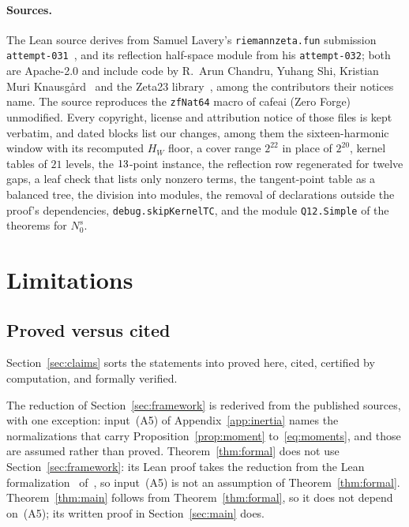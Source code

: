 \documentclass[11pt]{article}
\theoremstyle{definition}
\begin{document}
\begin{sloppypar}
\paragraph{Sources.}
The Lean source derives from Samuel Lavery's \texttt{riemannzeta.fun}
submission \texttt{attempt-031}~\cite{Lav26}, and its reflection half-space
module from his \texttt{attempt-032}; both are Apache-2.0 and include code by
R.~Arun Chandru, Yuhang Shi, Kristian Muri Knausg\aa rd~\cite{Kna26} and the
Zeta23 library~\cite{Zeta23Lean}, among the contributors their notices name.
The source reproduces the \texttt{zfNat64} macro of cafeai (Zero Forge)
unmodified. Every copyright, license and attribution notice of those files is
kept verbatim, and dated blocks list our changes, among them the sixteen-harmonic
window with its recomputed $H_W$ floor, a cover range $2^{22}$ in place of
$2^{20}$, kernel tables of $21$ levels, the $13$-point instance, the
reflection row regenerated for twelve gaps, a leaf check that lists only
nonzero terms, the tangent-point table as a balanced tree, the division
into modules, the removal of declarations outside the proof's dependencies,
\texttt{debug.skipKernelTC}, and the module \texttt{Q12.Simple} of the theorems
for $N_0^s$.
\end{sloppypar}

\section{Limitations}\label{sec:limits}

\subsection{Proved versus cited}
Section~\ref{sec:claims} sorts the statements into proved here, cited,
certified by computation, and formally verified.

The reduction of Section~\ref{sec:framework} is rederived from the published
sources, with one exception: input~(A5) of Appendix~\ref{app:inertia} names
the normalizations that carry Proposition~\ref{prop:moment}
to~\eqref{eq:moments}, and those are assumed rather than proved.
Theorem~\ref{thm:formal} does not use Section~\ref{sec:framework}: its Lean
proof takes the reduction from the Lean formalization~\cite{Zeta23Lean}
of~\cite{AF26}, so input~(A5) is not an assumption of
Theorem~\ref{thm:formal}. Theorem~\ref{thm:main} follows from
Theorem~\ref{thm:formal}, so it does not depend on~(A5); its written proof in
Section~\ref{sec:main} does.
\end{document}
